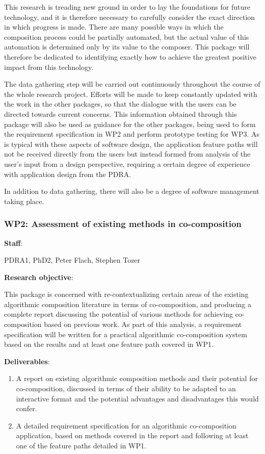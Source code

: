 \documentclass[11pt]{article}
\begin{document}
	This research is treading new ground in order to lay the foundations for future technology, and it is therefore necessary to carefully consider the exact direction in which progress is made. There are many possible ways in which the composition process could be partially automated, but the actual value of this automation is determined only by its value to the composer. This package will therefore be dedicated to identifying exactly how to achieve the greatest positive impact from this technology.

	The data gathering step will be carried out continuously throughout the course of the whole research project. Efforts will be made to keep constantly updated with the work in the other packages, so that the dialogue with the users can be directed towards current concerns. This information obtained through this package will also be used as guidance for the other packages, being used to form the requirement specification in WP2 and perform prototype testing for WP3. As is typical with these aspects of software design, the application feature paths will not be received directly from the users but instead formed from analysis of the user's input from a design perspective, requiring a certain degree of experience with application design from the PDRA.
	
	In addition to data gathering, there will also be a degree of software management taking place.
	
	\subsubsection*{WP2: Assessment of existing methods in co-composition}
	
	\noindent \textbf{Staff}:
	\smallskip
	
	PDRA1, PhD2, Peter Flach, Stephen Tozer
	
	\textbf{Research objective}:
	\smallskip
	
	This package is concerned with re-contextualizing certain areas of the existing algorithmic composition literature in terms of co-composition, and producing a complete report discussing the potential of various methods for achieving co-composition based on previous work. As part of this analysis, a requirement specification will be written for a practical algorithmic co-composition system based on the results and at least one feature path covered in WP1. 
	
	\bigskip
	\noindent \textbf{Deliverables}:
	\begin{enumerate}
		\item A report on existing algorithmic composition methods and their potential for co-composition, discussed in terms of their ability to be adapted to an interactive format and the potential advantages and disadvantages this would confer.
		\item A detailed requirement specification for an algorithmic co-composition application, based on methods covered in the report and following at least one of the feature paths detailed in WP1.
	\end{enumerate}
	
\end{document}
